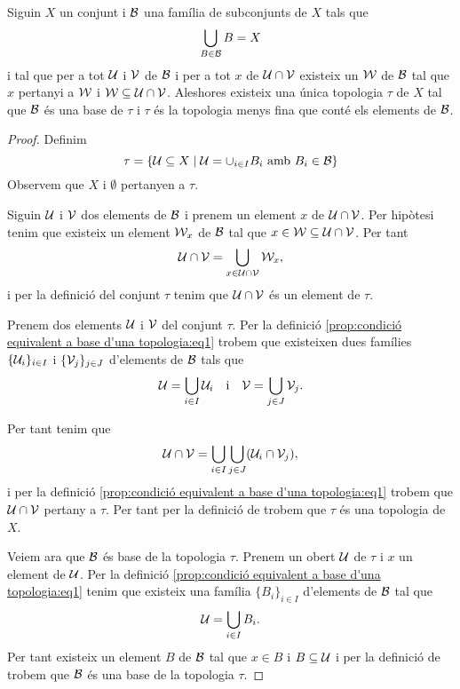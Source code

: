 \documentclass[../../Main.tex]{subfiles}
\begin{document}
	\begin{proposition}
		\label{prop:condició equivalent a base d'una topologia}
		\label{prop:condició per que una topologia sigui la més fina que conté una base}
		Siguin \(X\) un conjunt i \(\mathcal{B}\) una família de subconjunts de \(X\) tals que
		\[
		    \bigcup_{B\in\mathcal{B}}B=X
		\]
		i tal que per a tot \(\mathcal{U}\) i \(\mathcal{V}\) de \(\mathcal{B}\) i per a tot \(x\) de \(\mathcal{U}\cap\mathcal{V}\) existeix un \(\mathcal{W}\) de \(\mathcal{B}\) tal que \(x\) pertanyi a \(\mathcal{W}\) i \(\mathcal{W}\subseteq\mathcal{U}\cap\mathcal{V}\).	Aleshores existeix una única topologia \(\tau\) de \(X\) tal que \(\mathcal{B}\) és una base de \(\tau\) i \(\tau\) és la topologia menys fina que conté els elements de \(\mathcal{B}\).
		\begin{proof}
			Definim
			\begin{equation}
				\label{prop:condició equivalent a base d'una topologia:eq1}
				\tau=\left\{\obert{U}\subseteq X\mid\obert{U}=\cup_{i\in I}B_{i}\text{ amb }B_{i}\in\base{B}\right\}
			\end{equation}
			Observem que \(X\) i \(\emptyset\) pertanyen a \(\tau\).
			
			Siguin \(\mathcal{U}\) i \(\mathcal{V}\) dos elements de \(\mathcal{B}\) i prenem un element \(x\) de \(\mathcal{U}\cap\mathcal{V}\). Per hipòtesi tenim que existeix un element  \(\mathcal{W}_{x}\) de \(\mathcal{B}\) tal que \(x\in\mathcal{W}\subseteq\mathcal{U}\cap\mathcal{V}\). Per tant
			\[
			    \mathcal{U}\cap\mathcal{V}=\bigcup_{x\in\mathcal{U}\cap\mathcal{V}}\mathcal{W}_{x},
			\]
			i per la definició del conjunt \(\tau\) tenim que \(\mathcal{U}\cap\mathcal{V}\) és un element de \(\tau\).
			
			Prenem dos elements \(\mathcal{U}\) i \(\mathcal{V}\) del conjunt \(\tau\). Per la definició \eqref{prop:condició equivalent a base d'una topologia:eq1} trobem que existeixen dues famílies \(\{\mathcal{U}_{i}\}_{i\in I}\) i \(\{\mathcal{V}_{j}\}_{j\in J}\) d'elements de \(\mathcal{B}\) tals que
			\[
			    \mathcal{U}=\bigcup_{i\in I}\mathcal{U}_{i}\quad\text{i}\quad\mathcal{V}=\bigcup_{j\in J}\mathcal{V}_{j}.
			\]
			
			Per tant tenim que
			\[
			    \mathcal{U}\cap\mathcal{V}=\bigcup_{i\in I}\bigcup_{j\in J}(\mathcal{U}_{i}\cap\mathcal{V}_{j}),
			\]
			i per la definició \eqref{prop:condició equivalent a base d'una topologia:eq1} trobem que \(\mathcal{U}\cap\mathcal{V}\) pertany a \(\tau\). Per tant per la definició de  trobem que \(\tau\) és una topologia de \(X\).
			
			Veiem ara que \(\mathcal{B}\) és base de la topologia \(\tau\). Prenem un obert \(\mathcal{U}\) de \(\tau\) i \(x\) un element de \(\mathcal{U}\). Per la definició \eqref{prop:condició equivalent a base d'una topologia:eq1} tenim que existeix una família \(\{B_{i}\}_{i\in I}\) d'elements de \(\mathcal{B}\) tal que
			\[
			    \mathcal{U}=\bigcup_{i\in I}B_{i}.
			\]
			Per tant existeix un element \(B\) de \(\mathcal{B}\) tal que \(x\in B\) i \(B\subseteq\mathcal{U}\) i per la definició de  trobem que \(\mathcal{B}\) és una base de la topologia \(\tau\).
			

\end{proof}
\end{proposition}
\end{document}
